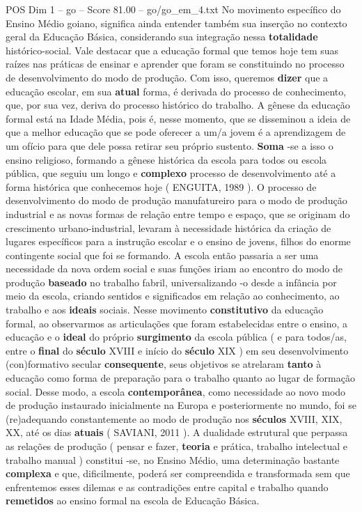 \begin{textsample}{POS Dim 1 – go – Score 81.00 – go/go\_em\_4.txt}
No movimento específico do Ensino Médio goiano, significa ainda entender também sua inserção no contexto geral da Educação Básica, considerando sua integração nessa \textbf{totalidade} histórico-social.
Vale destacar que a educação formal que temos hoje tem suas raízes nas práticas de ensinar e aprender que foram se constituindo no processo de desenvolvimento do modo de produção.
Com isso, queremos \textbf{dizer} que a educação escolar, em sua \textbf{atual} forma, é derivada do processo de conhecimento, que, por sua vez, deriva do processo histórico do trabalho.
A gênese da educação formal está na Idade Média, pois é, nesse momento, que se disseminou a ideia de que a melhor educação que se pode oferecer a um/a jovem é a aprendizagem de um ofício para que dele possa retirar seu próprio sustento. \textbf{Soma} -se a isso o ensino religioso, formando a gênese histórica da escola para todos ou escola pública, que seguiu um longo e \textbf{complexo} processo de desenvolvimento até a forma histórica que conhecemos hoje ( ENGUITA, 1989 ).
O processo de desenvolvimento do modo de produção manufatureiro para o modo de produção industrial e as novas formas de relação entre tempo e espaço, que se originam do crescimento urbano-industrial, levaram à necessidade histórica da criação de lugares específicos para a instrução escolar e o ensino de jovens, filhos do enorme contingente social que foi se formando.
A escola então passaria a ser uma necessidade da nova ordem social e suas funções iriam ao encontro do modo de produção \textbf{baseado} no trabalho fabril, universalizando -o desde a infância por meio da escola, criando sentidos e significados em relação ao conhecimento, ao trabalho e aos \textbf{ideais} sociais.
Nesse movimento \textbf{constitutivo} da educação formal, ao observarmos as articulações que foram estabelecidas entre o ensino, a educação e o \textbf{ideal} do próprio \textbf{surgimento} da escola pública ( e para todos/as, entre o \textbf{final} do \textbf{século} XVIII e início do \textbf{século} XIX ) em seu desenvolvimento (con)formativo secular \textbf{consequente}, seus objetivos se atrelaram \textbf{tanto} à educação como forma de preparação para o trabalho quanto ao lugar de formação social.
Desse modo, a escola \textbf{contemporânea}, como necessidade ao novo modo de produção instaurado inicialmente na Europa e posteriormente no mundo, foi se (re)adequando constantemente ao modo de produção nos \textbf{séculos} XVIII, XIX, XX, até os dias \textbf{atuais} ( SAVIANI, 2011 ).
A dualidade estrutural que perpassa as relações de produção ( pensar e fazer, \textbf{teoria} e prática, trabalho intelectual e trabalho manual ) constitui -se, no Ensino Médio, uma determinação bastante \textbf{complexa} e que, dificilmente, poderá ser compreendida e transformada sem que enfrentemos esses dilemas e as contradições entre capital e trabalho quando \textbf{remetidos} ao ensino formal na escola de Educação Básica.

\end{textsample}
